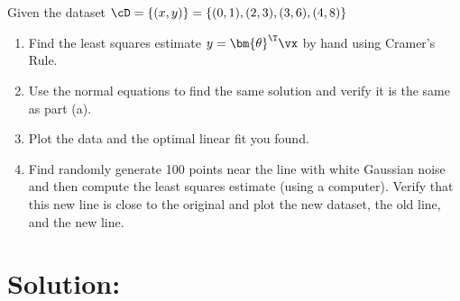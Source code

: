 \documentclass[189]{pset}
\begin{document}

  \section{}
    Given the dataset $\cD = \{(x,y)\} = \{(0,1), (2,3), (3,6), (4,8)\}$
    \begin{enumerate}
      \item Find the least squares estimate $y = {\bm{\theta}}^\T\vx$ by
        hand using Cramer's Rule.
      \item Use the normal equations to find the same solution and
        verify it is the same as part (a).
      \item Plot the data and the optimal linear fit you found.
      \item Find randomly generate 100 points near the line with white
        Gaussian noise and then compute the least squares estimate
        (using a computer). Verify that this new line is close to the
        original and plot the new dataset, the old line, and the new
        line.
    \end{enumerate}

  \hrulefill

  \section*{Solution:}
\end{document}
